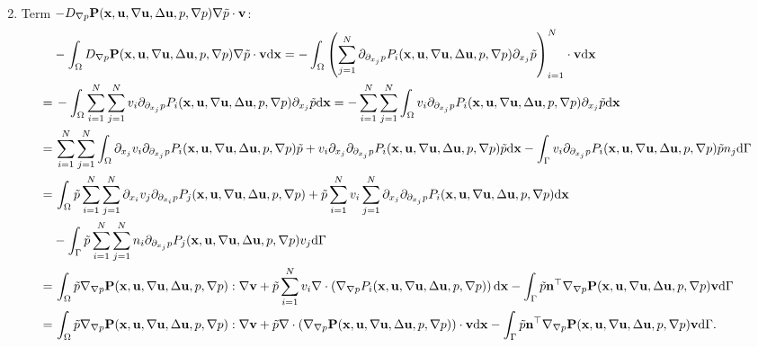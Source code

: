 \documentclass[oneside,11pt]{book}
\numberwithin{equation}{section}
\begin{document}
\begin{enumerate}[leftmargin=0in]
\begin{align*}
    \end{align*}
    \item Term $-D_{\nabla p}{\bf P}({\bf x},{\bf u},\nabla{\bf u},\Delta{\bf u},p,\nabla p)\nabla\tilde{p}\cdot{\bf v}$:
    \begin{align*}
        &-\int_\Omega D_{\nabla p}{\bf P}({\bf x},{\bf u},\nabla{\bf u},\Delta{\bf u},p,\nabla p)\nabla\tilde{p}\cdot{\bf v}{\rm d}{\bf x} = -\int_\Omega \left(\sum_{j=1}^N \partial_{\partial_{x_j}p}P_i({\bf x},{\bf u},\nabla{\bf u},\Delta{\bf u},p,\nabla p)\partial_{x_j}\tilde{p}\right)_{i=1}^N\cdot{\bf v}{\rm d}{\bf x}\\
        =&\, - \int_\Omega \sum_{i=1}^N\sum_{j=1}^N v_i\partial_{\partial_{x_j}p}P_i({\bf x},{\bf u},\nabla{\bf u},\Delta{\bf u},p,\nabla p)\partial_{x_j}\tilde{p}{\rm d}{\bf x} = - \sum_{i=1}^N\sum_{j=1}^N \int_\Omega v_i\partial_{\partial_{x_j}p}P_i({\bf x},{\bf u},\nabla{\bf u},\Delta{\bf u},p,\nabla p)\partial_{x_j}\tilde{p}{\rm d}{\bf x}\\
        =&\, \sum_{i=1}^N\sum_{j=1}^N \int_\Omega \partial_{x_j}v_i\partial_{\partial_{x_j}p}P_i({\bf x},{\bf u},\nabla{\bf u},\Delta{\bf u},p,\nabla p)\tilde{p} + v_i\partial_{x_j}\partial_{\partial_{x_j}p}P_i({\bf x},{\bf u},\nabla{\bf u},\Delta{\bf u},p,\nabla p)\tilde{p}{\rm d}{\bf x} - \int_\Gamma v_i\partial_{\partial_{x_j}p}P_i({\bf x},{\bf u},\nabla{\bf u},\Delta{\bf u},p,\nabla p)\tilde{p}n_j{\rm d}\Gamma\\
        =&\, \int_\Omega \tilde{p}\sum_{i=1}^N\sum_{j=1}^N \partial_{x_i}v_j\partial_{\partial_{x_i}p}P_j({\bf x},{\bf u},\nabla{\bf u},\Delta{\bf u},p,\nabla p) + \tilde{p}\sum_{i=1}^N v_i\sum_{j=1}^N \partial_{x_j}\partial_{\partial_{x_j}p}P_i({\bf x},{\bf u},\nabla{\bf u},\Delta{\bf u},p,\nabla p){\rm d}{\bf x}\\
        &- \int_\Gamma \tilde{p}\sum_{i=1}^N\sum_{j=1}^N n_i\partial_{\partial_{x_j}p}P_j({\bf x},{\bf u},\nabla{\bf u},\Delta{\bf u},p,\nabla p)v_j{\rm d}\Gamma\\
        =&\, \int_\Omega \tilde{p}\nabla_{\nabla p}{\bf P}({\bf x},{\bf u},\nabla{\bf u},\Delta{\bf u},p,\nabla p):\nabla{\bf v} + \tilde{p}\sum_{i=1}^N v_i\nabla\cdot\left(\nabla_{\nabla p}P_i({\bf x},{\bf u},\nabla{\bf u},\Delta{\bf u},p,\nabla p)\right){\rm d}{\bf x} - \int_\Gamma \tilde{p}{\bf n}^\top\nabla_{\nabla p}{\bf P}({\bf x},{\bf u},\nabla{\bf u},\Delta{\bf u},p,\nabla p){\bf v}{\rm d}\Gamma\\
        =&\, \int_\Omega \tilde{p}\nabla_{\nabla p}{\bf P}({\bf x},{\bf u},\nabla{\bf u},\Delta{\bf u},p,\nabla p):\nabla{\bf v} + \tilde{p}\nabla\cdot\left(\nabla_{\nabla p}{\bf P}({\bf x},{\bf u},\nabla{\bf u},\Delta{\bf u},p,\nabla p)\right)\cdot{\bf v}{\rm d}{\bf x} - \int_\Gamma \tilde{p}{\bf n}^\top\nabla_{\nabla p}{\bf P}({\bf x},{\bf u},\nabla{\bf u},\Delta{\bf u},p,\nabla p){\bf v}{\rm d}\Gamma.

\end{align*}
\end{enumerate}
\end{document}
